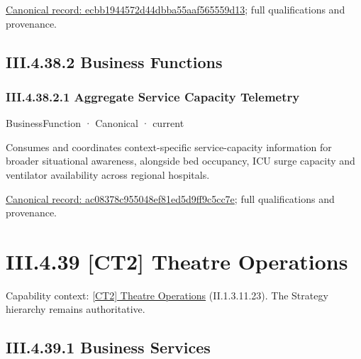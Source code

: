 {\footnotesize \href{../../../../continuum/business/business-service/ecbb1944572d44dbba55aaf565559d13.md}{Canonical record: ecbb1944572d44dbba55aaf565559d13}; full qualifications and provenance.}\par
\subsection*{III.4.38.2 Business Functions}
\label{navigation:III.4.38.2}

\subsubsection*{III.4.38.2.1 Aggregate Service Capacity Telemetry}
\label{navigation:III.4.38.2.1}

\label{element:ac08378c955048ef81ed5d9ff9c5cc7e}
{\small BusinessFunction · Canonical · current}\par

Consumes and coordinates context-specific service-capacity information for broader situational awareness, alongside bed occupancy, ICU surge capacity and ventilator availability across regional hospitals.


{\footnotesize \href{../../../../continuum/business/business-function/ac08378c955048ef81ed5d9ff9c5cc7e.md}{Canonical record: ac08378c955048ef81ed5d9ff9c5cc7e}; full qualifications and provenance.}\par
\section*{III.4.39 [CT2] Theatre Operations}
\label{navigation:III.4.39}

{\small Capability context: \hyperref[element:4bf7a8260e1444fdac44e97c3557b533]{[CT2] Theatre Operations} (II.1.3.11.23). The Strategy hierarchy remains authoritative.}\par
\subsection*{III.4.39.1 Business Services}
\label{navigation:III.4.39.1}

